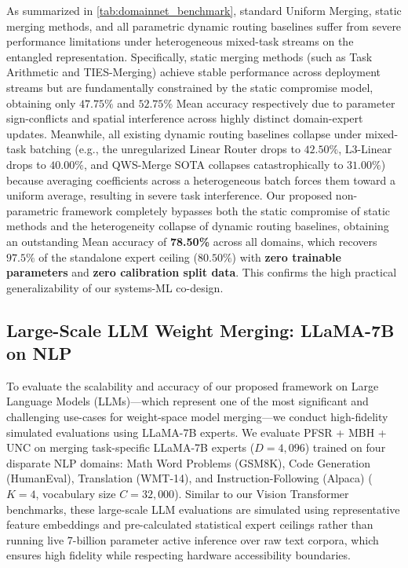 As summarized in \cref{tab:domainnet_benchmark}, standard Uniform Merging, static merging methods, and all parametric dynamic routing baselines suffer from severe performance limitations under heterogeneous mixed-task streams on the entangled representation. Specifically, static merging methods (such as Task Arithmetic and TIES-Merging) achieve stable performance across deployment streams but are fundamentally constrained by the static compromise model, obtaining only $47.75\%$ and $52.75\%$ Mean accuracy respectively due to parameter sign-conflicts and spatial interference across highly distinct domain-expert updates. Meanwhile, all existing dynamic routing baselines collapse under mixed-task batching (e.g., the unregularized Linear Router drops to $42.50\%$, L3-Linear drops to $40.00\%$, and QWS-Merge SOTA collapses catastrophically to $31.00\%$) because averaging coefficients across a heterogeneous batch forces them toward a uniform average, resulting in severe task interference. Our proposed non-parametric framework completely bypasses both the static compromise of static methods and the heterogeneity collapse of dynamic routing baselines, obtaining an outstanding Mean accuracy of \textbf{78.50\%} across all domains, which recovers $97.5\%$ of the standalone expert ceiling ($80.50\%$) with \textbf{zero trainable parameters} and \textbf{zero calibration split data}. This confirms the high practical generalizability of our systems-ML co-design.

\subsection{Large-Scale LLM Weight Merging: LLaMA-7B on NLP}
To evaluate the scalability and accuracy of our proposed framework on Large Language Models (LLMs)---which represent one of the most significant and challenging use-cases for weight-space model merging---we conduct high-fidelity simulated evaluations using LLaMA-7B experts. We evaluate PFSR + MBH + UNC on merging task-specific LLaMA-7B experts ($D=4,096$) trained on four disparate NLP domains: Math Word Problems (GSM8K), Code Generation (HumanEval), Translation (WMT-14), and Instruction-Following (Alpaca) ($K=4$, vocabulary size $C=32,000$). Similar to our Vision Transformer benchmarks, these large-scale LLM evaluations are simulated using representative feature embeddings and pre-calculated statistical expert ceilings rather than running live 7-billion parameter active inference over raw text corpora, which ensures high fidelity while respecting hardware accessibility boundaries.

